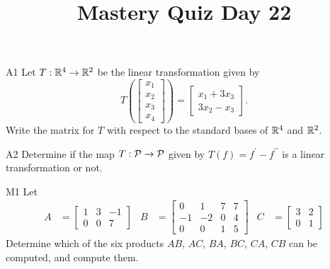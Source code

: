 \documentclass{sbgLAquiz}
\title{Mastery Quiz Day 22 }
\begin{document}
\begin{problem}{A1}
Let $T: \IR^4 \rightarrow \IR^2$ be the linear transformation given by $$T\left(\begin{bmatrix} x_1 \\ x_2 \\ x_3 \\ x_4 \end{bmatrix} \right) = \begin{bmatrix} x_1+3x_3 \\ 3x_2-x_3 \end{bmatrix}.$$ Write the matrix for $T$ with respect to the standard bases of $\IR^4$ and $\IR^2$.
\end{problem}

\begin{problem}{A2}
Determine if the map $T: \P  \rightarrow \P$ given by $T(f) = f^{\prime}-f^{\prime \prime}$ is a linear transformation or not.
\end{problem}
\newpage

\begin{problem}{M1}
Let
\begin{align*}
A &= \begin{bmatrix} 1 & 3 & -1  \\ 0 & 0 & 7  \end{bmatrix} & B &= \begin{bmatrix} 0 & 1 & 7 & 7 \\ -1 & -2 & 0 & 4 \\ 0 & 0 & 1 & 5 \end{bmatrix} & C&=\begin{bmatrix} 3 & 2 \\ 0 & 1 \end{bmatrix}
\end{align*}
Determine which of the six products $AB$, $AC$, $BA$, $BC$, $CA$, $CB$ can be computed, and compute them.
\end{problem}
\end{document}

